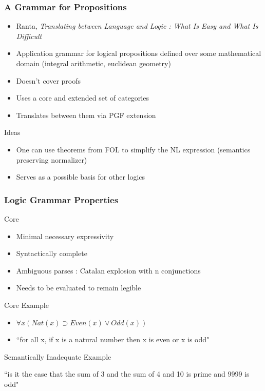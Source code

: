 \documentclass[10pt]{beamer}
\begin{document}
\begin{frame}
\frametitle{A Grammar for Propositions}

\begin{itemize}
\item Ranta, \emph{Translating between Language and Logic : What Is Easy and What Is Difficult}
\item Application grammar for logical propositions defined over some mathematical
domain (integral arithmetic, euclidean geometry)
\item Doesn't cover proofs
\item Uses a core and extended set of categories
\item Translates between them via PGF extension
\end{itemize}

\begin{exampleblock}{Ideas}
\begin{itemize}
\item One can use theorems from FOL to simplify the
NL expression (semantics preserving normalizer)
\item Serves as a possible basis for other logics 
\end{itemize}
\end{exampleblock}

\end{frame}

\begin{frame}
\frametitle{Logic Grammar Properties}

\begin{block}{Core}
\begin{itemize}
\item Minimal necessary expressivity
\item Syntactically complete
\item Ambiguous parses : Catalan explosion with n conjunctions
\item Needs to be evaluated to remain legible 
\end{itemize}
\end{block}

\begin{exampleblock}{Core Example}
\begin{itemize}
\item $\forall x (Nat(x) \supset Even(x) \lor Odd(x))$
\item ``for all x, if x is a natural number then x is even or x is odd"
\end{itemize}
\end{exampleblock}

\begin{exampleblock}{Semantically Inadequate Example}

``is it the case that the sum of 3 and the sum of 4 and 10 is prime and 9999 is odd"

\end{exampleblock}
\end{frame}
\end{document}
